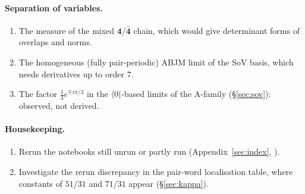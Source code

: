 \paragraph{Separation of variables.}
\begin{enumerate}
\item The measure of the mixed $\mathbf4/\bar{\mathbf4}$ chain, which would give determinant forms of overlaps and norms.
\item The homogeneous (fully pair-periodic) ABJM limit of the SoV basis, which needs derivatives up to order 7.
\item The factor $\tfrac13e^{\mp i\pi/3}$ in the $\langle0|$-based limits of the A-family (\S\ref{sec:sov}): observed, not derived.
\end{enumerate}

\paragraph{Housekeeping.}
\begin{enumerate}
\item Rerun the notebooks still unrun or partly run (Appendix~\ref{sec:index}, ).
\item Investigate the rerun discrepancy in the pair-word localisation table, where constants of $51/31$ and $71/31$ appear
  (\S\ref{sec:kappa}).
\end{enumerate}
